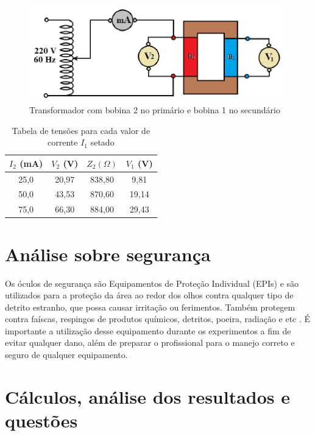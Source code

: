 \documentclass[a4paper,12pt,oneside,openany,table,xcdraw]{article}
\begin{document}
\begin{enumerate}[1)]
\begin{figure}[H]
\centering
\captionsetup{font=scriptsize}
\includegraphics[width=11cm]{fig5}
\caption{Transformador com bobina 2 no primário e bobina 1 no secundário}
\label{2.6}
\end{figure}
\begin{table}[H]
\centering
\def\arraystretch{1.35}
\captionsetup{type=table, font=scriptsize}
\caption{Tabela de tensões para cada valor de corrente $I_1$ setado} \label{tab4}
\begin{tabular}{|c|c|c|c|}
\hline
$I_2$ (mA) & $V_2$ (V)  & $Z_{2} (\Omega)$ & $V_1$ (V) \\ \hline
25,0          & 20,97  &  838,80       &  9,81     \\ \hline
50,0          & 43,53  &  870,60       &  19,14   \\ \hline
75,0          & 66,30  &  884,00       &  29,43   \\ \hline
\end{tabular}
\end{table}

\end{enumerate}

\section{Análise sobre segurança} %
Os óculos de segurança são Equipamentos de Proteção Individual (EPIs) e são utilizados para a proteção da área ao redor dos olhos contra qualquer tipo de detrito estranho, que possa causar irritação ou ferimentos. Também protegem contra faíscas, respingos de produtos químicos, detritos, poeira, radiação e etc \cite{safe}.
É importante a utilização desse equipamento durante os experimentos a fim de evitar qualquer dano, além de preparar o profissional para o manejo correto e seguro de qualquer equipamento.

\section{Cálculos, análise dos resultados e questões} %
\end{document}
